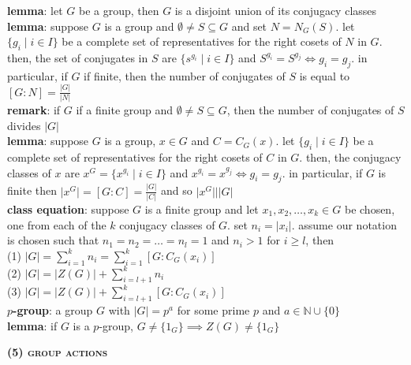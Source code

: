 \documentclass[a4paper]{article}
\newcommand\abs[1]{\ensuremath{\lvert#1\rvert}}
\newcommand\divides{\ensuremath{\big|}}
\begin{document}
\begin{multicols}{2}
\begin{framed}
	\noindent
	\textbf{lemma}: let $G$ be a group, then $G$ is a disjoint union of its conjugacy classes\\
	
	\noindent
	\textbf{lemma}: suppose $G$ is a group and $\emptyset \neq S \subseteq G$ and set $N = N_G(S)$. let $\{g_i \; \vert \; i \in I\}$ be a complete set of representatives for the right cosets of $N$ in $G$. then, the set of conjugates in $S$ are $\{s^{g_i} \; \vert \; i \in I\}$ and $S^{g_i} = S^{g_j} \iff g_i = g_j$. in particular, if $G$ if finite, then the number of conjugates of $S$ is equal to $[G:N] = \frac{\abs{G}}{\abs{N}}$\\
	
	\noindent
	\textbf{remark}: if $G$ if a finite group and $\emptyset \neq S \subseteq G$, then the number of conjugates of $S$ divides $\abs{G}$\\
	
	\noindent
	\textbf{lemma}: suppose $G$ is a group, $x \in G$ and $C = C_G(x)$. let $\{g_i \; \vert \; i \in I\}$ be a complete set of representatives for the right cosets of $C$ in $G$. then, the conjugacy classes of $x$ are $x^G = \{x^{g_i} \; \vert \; i \in I\}$ and $x^{g_i} = x^{g_j} \iff g_i = g_j$. in particular, if $G$ is finite then $\abs{x^G} = [G:C] = \frac{\abs{G}}{\abs{C}}$ and so $\abs{x^G} \divides \abs{G}$\\
	
	\noindent
	\textbf{class equation}: suppose $G$ is a finite group and let $x_1, x_2, \dots, x_k \in G$ be chosen, one from each of the $k$ conjugacy classes of $G$. set $n_i = \abs{x_i}$. assume our notation is chosen such that $n_1 = n_2 = \dots = n_l = 1$ and $n_i > 1$ for $i \geq l$, then\\
	(1) $\abs{G} = \sum_{i=1}^k n_i = \sum_{i=1}^k [G: C_G(x_i)]$\\
	(2) $\abs{G} = \abs{Z(G)} + \sum_{i = l + 1}^k n_i$\\
	(3) $\abs{G} = \abs{Z(G)} + \sum_{i=l+1}^k [G: C_G(x_i)]$\\
	
	\noindent
	$p$\textbf{-group}: a group $G$ with $\abs{G} = p^a$ for some prime $p$ and $a \in \mathbb{N}\cup \{0\}$\\
	
	\noindent
	\textbf{lemma}: if $G$ is a $p$-group, $G \neq \{1_G\} \implies Z(G) \neq \{1_G\}$
\end{framed}

\begin{framed}
	\begin{center}
		\textbf{\textsc{(5) group actions}}
	\end{center}
	

\end{framed}
\end{multicols}
\end{document}
